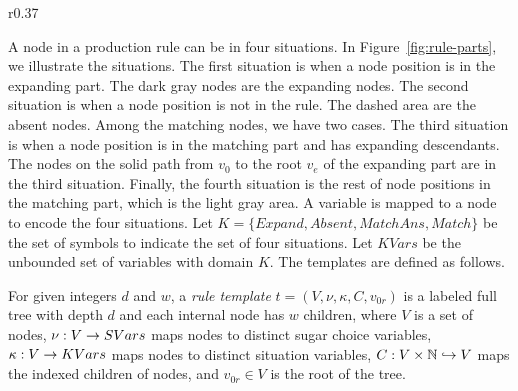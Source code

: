 \begin{wrapfigure}{r}{0.37\textwidth}
    \vspace{-10mm}
        \center
  \caption{Parts of production rules in the rule templates.}
  \label{fig:rule-parts}
  \vspace{-8mm}
\end{wrapfigure}
A node in a production rule can be in four situations.
In Figure~\ref{fig:rule-parts}, we illustrate the situations.
The first situation is when a node position is in the expanding part.
The dark gray nodes are the expanding nodes.
The second situation is when a node position is not in the rule.
The dashed area are the absent nodes.
Among the matching nodes, we have two cases.
The third situation is when a node position is in the matching part
and has expanding descendants.
The nodes on the solid path from $v_0$ to the root $v_e$ of the expanding part are in the third situation.
Finally, the fourth situation is the rest of node positions
in the matching part, which is the light gray area.
A variable is mapped to a node to encode the four situations.
Let $K =\{Expand,Absent,MatchAns,Match\}$ be the set of symbols to
indicate the set of four situations.
Let $KVars$ be the unbounded set of variables with domain $K$. 
The templates are defined as follows.

\begin{df}
For given integers $d$ and $w$,
a {\em rule template} $t = (V, \nu, \kappa, C, v_{0r})$ is a labeled full tree with depth $d$ and 
each internal node has $w$ children, where 
$V$ is a set of nodes, $\nu : V \rightarrow SVars$ maps nodes to distinct
sugar choice variables, 
$\kappa : V \rightarrow KVars$ maps nodes to distinct situation variables,
$C : V \times \mathbb{N} \hookrightarrow V$ maps the indexed children of nodes,
and
$v_{0r} \in V$ is the root of the tree.
\end{df}

